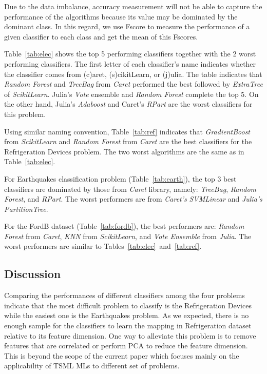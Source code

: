 \documentclass{juliacon}
\begin{document}
Due to the data imbalance, accuracy measurement will not be able to capture the performance of the algorithms because its value may be dominated by the dominant class. In this regard, we use Fscore to measure the performance of a given classifier to each class and get the mean of this Fscores.

Table~\ref{tab:elec} shows the top 5 performing classifiers together with the 2 worst performing classifiers. The first letter of each classifier's name indicates whether the classifier comes from (c)aret, (s)cikitLearn, or (j)ulia. The table indicates that \emph{Random Forest} and \emph{TreeBag} from \emph{Caret} performed the best followed by \emph{ExtraTree} of \emph{ScikitLearn}. Julia's \emph{Vote} ensemble and \emph{Random Forest} complete the top 5. On the other hand, Julia's \emph{Adaboost} and Caret's \emph{RPart} are the worst classifiers for this problem.  

\vskip 6pt

Using similar naming convention, Table~\ref{tab:ref} indicates that \emph{GradientBoost} from \emph{ScikitLearn} and \emph{Random Forest} from \emph{Caret} are the best classifiers for the Refrigeration Devices problem. The two worst algorithms are the same as in Table~\ref{tab:elec}.

\vskip 6pt

For Earthquakes classification problem (Table~\ref{tab:earth}), the top 3 best classifiers are dominated by those from \emph{Caret} library, namely: \emph{TreeBag}, \emph{Random Forest}, and \emph{RPart}. The worst performers are from \emph{Caret's} \emph{SVMLinear} and \emph{Julia's} \emph{PartitionTree}.

\vskip 6pt

For the FordB dataset (Table~\ref{tab:fordb}), the best performers are: \emph{Random Forest} from \emph{Caret}, \emph{KNN} from \emph{ScikitLearn}, and \emph{Vote Ensemble} from \emph{Julia}. The worst performers are similar to Tables~\ref{tab:elec}~and~\ref{tab:ref}.

\subsection{Discussion}
Comparing the performances of different classifiers among the four problems indicate that the most difficult problem to classify is the Refrigeration Devices while the easiest one is the Earthquakes problem. As we expected, there is no enough sample for the classifiers to learn the mapping in Refrigeration dataset relative to its feature dimension. One way to alleviate this problem is to remove features that are correlated or perform PCA to reduce the feature dimension. This is beyond the scope of the current paper which focuses mainly on the applicability of TSML MLs to different set of problems. 
\end{document}
